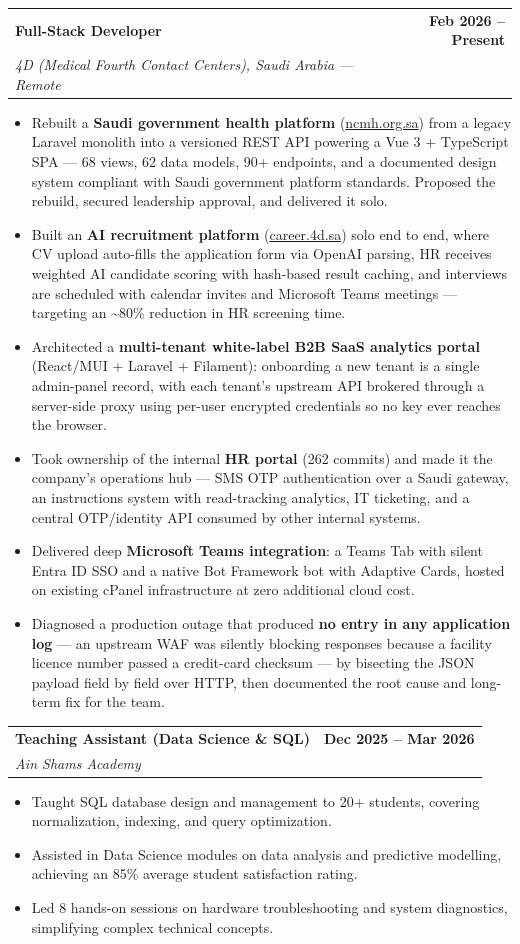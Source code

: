 \documentclass[letterpaper,11pt]{article}
\makeatletter
\newcommand{\resumeItem}[1]{
  \item\small{
    {#1 \vspace{-2pt}}
  }
}
\newcommand{\resumeSubheading}[4]{
  \vspace{-2pt}\item
    \begin{tabular*}{1.0\textwidth}[t]{l@{\extracolsep{\fill}}r}
      \textbf{#1} & \textbf{\small #2} \\
      \textit{\small#3} & \textit{\small #4} \\
    \end{tabular*}\vspace{-7pt}
}
\newcommand{\resumeItemListStart}{\begin{itemize}}
\newcommand{\resumeItemListEnd}{\end{itemize}\vspace{-5pt}}
\makeatother
\begin{document}
    \resumeSubheading
      {Full-Stack Developer}{Feb 2026 -- Present}
      {4D (Medical Fourth Contact Centers), Saudi Arabia — Remote}{}
      \resumeItemListStart
        \resumeItem{Rebuilt a \textbf{Saudi government health platform} (\href{https://ncmh.org.sa/}{ncmh.org.sa}) from a legacy Laravel monolith into a versioned REST API powering a Vue 3 + TypeScript SPA — 68 views, 62 data models, 90+ endpoints, and a documented design system compliant with Saudi government platform standards. Proposed the rebuild, secured leadership approval, and delivered it solo.}
        \resumeItem{Built an \textbf{AI recruitment platform} (\href{https://career.4d.sa/}{career.4d.sa}) solo end to end, where CV upload auto-fills the application form via OpenAI parsing, HR receives weighted AI candidate scoring with hash-based result caching, and interviews are scheduled with calendar invites and Microsoft Teams meetings — targeting an \textasciitilde80\% reduction in HR screening time.}
        \resumeItem{Architected a \textbf{multi-tenant white-label B2B SaaS analytics portal} (React/MUI + Laravel + Filament): onboarding a new tenant is a single admin-panel record, with each tenant's upstream API brokered through a server-side proxy using per-user encrypted credentials so no key ever reaches the browser.}
        \resumeItem{Took ownership of the internal \textbf{HR portal} (262 commits) and made it the company's operations hub — SMS OTP authentication over a Saudi gateway, an instructions system with read-tracking analytics, IT ticketing, and a central OTP/identity API consumed by other internal systems.}
        \resumeItem{Delivered deep \textbf{Microsoft Teams integration}: a Teams Tab with silent Entra ID SSO and a native Bot Framework bot with Adaptive Cards, hosted on existing cPanel infrastructure at zero additional cloud cost.}
        \resumeItem{Diagnosed a production outage that produced \textbf{no entry in any application log} — an upstream WAF was silently blocking responses because a facility licence number passed a credit-card checksum — by bisecting the JSON payload field by field over HTTP, then documented the root cause and long-term fix for the team.}
      \resumeItemListEnd

    \resumeSubheading
      {Teaching Assistant (Data Science \& SQL)}{Dec 2025 -- Mar 2026}
      {Ain Shams Academy}{}
      \resumeItemListStart
        \resumeItem{Taught SQL database design and management to 20+ students, covering normalization, indexing, and query optimization.}
        \resumeItem{Assisted in Data Science modules on data analysis and predictive modelling, achieving an 85\% average student satisfaction rating.}
        \resumeItem{Led 8 hands-on sessions on hardware troubleshooting and system diagnostics, simplifying complex technical concepts.}
      \resumeItemListEnd
\end{document}

